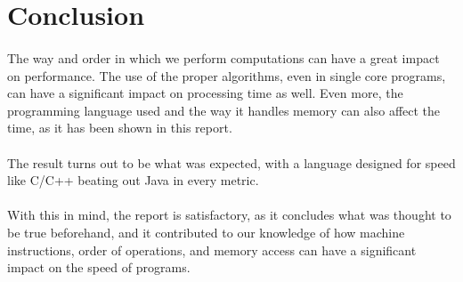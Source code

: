 \documentclass[11pt]{report}
\begin{document}
    \section*{Conclusion}

    \paragraph{}The way and order in which we perform computations can have a great impact on performance. The use of the proper algorithms, even in single core programs, can have a significant impact on processing time as well. Even more, the programming language used and the way it handles memory can also affect the time, as it has been shown in this report.

    \paragraph{}The result turns out to be what was expected, with a language designed for speed like C/C++ beating out Java in every metric.

    \paragraph{}With this in mind, the report is satisfactory, as it concludes what was thought to be true beforehand, and it contributed to our knowledge of how machine instructions, order of operations, and memory access can have a significant impact on the speed of programs.
\end{document}
